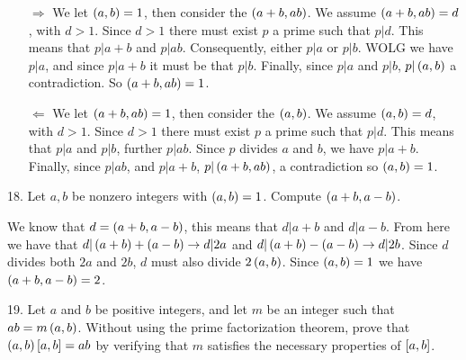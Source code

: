\begin{mdframed}[style=darkAnswer,frametitle={Joe Starr}]
  \begin{itemize}[align=left]
    \item [$\Rightarrow$]{
          We let $\left(a,b\right)=1$, then consider the $\left(a+b,ab\right)$. We assume
          $\left(a+b,ab\right)=d$, with $d>1$. Since $d>1$ there must exist $p$ a prime such that
          $p\vert d$. This means that $p\vert a+b$ and $p \vert ab$. Consequently, either
          $p\vert a$ or $p\vert b$. WOLG we have $p\vert a$, and since $p\vert a+b$ it
          must be that $p\vert b$. Finally, since $p\vert a $ and $p\vert b$,
          $p\vert \left(a,b\right)$ a contradiction. So $\left(a+b,ab\right)=1$.
          }
    \item [$\Leftarrow$]{
          We let $\left(a+b,ab\right)=1$, then consider the $\left(a,b\right)$. We assume
          $\left(a,b\right)=d$, with $d>1$. Since $d>1$ there must exist $p$ a prime such that
          $p\vert d$. This means that $p\vert a$ and $p\vert b$, further $p \vert ab$.
          Since $p$ divides $a$ and $b$, we have $p\vert a+b$. Finally, since $p\vert ab$,
          and $p\vert a+b$, $p\vert \left(a+b,ab\right)$, a contradiction so $\left(a,b\right)=1$.
          }
  \end{itemize}
\end{mdframed}
\newpage
\begin{mdframed}[style=darkQuesion]
  18. Let $a,b$ be nonzero integers with $\left(a,b\right)=1$. Compute $\left(a+b,a-b\right)$.
\end{mdframed}

\begin{mdframed}[style=darkAnswer,frametitle={Joe Starr}]
  We know that $d=\left(a+b,a-b\right)$, this means that $d\vert a+b$ and $d\vert a-b$.
  From here we have that $d\vert \left(a+b\right)+\left(a-b\right) \rightarrow d\vert 2a$ and
  $d\vert \left(a+b\right)-\left(a-b\right) \rightarrow d\vert 2b$. Since $d$ divides both $2a$
  and $2b$, $d$ must also divide $2\left(a,b\right)$. Since $\left(a,b\right)=1$ we have
  $\left(a+b,a-b\right)=2$.
\end{mdframed}
\newpage
\begin{mdframed}[style=darkQuesion]
  19. Let $a$ and $b$ be positive integers, and let $m$ be an integer such that
  $ab=m\left(a,b\right)$. Without using the prime factorization theorem, prove that
  $\left(a,b\right)\left[a,b\right]=ab$ by verifying that $m$ satisfies the necessary properties
  of $\left[a,b\right]$.
\end{mdframed}

